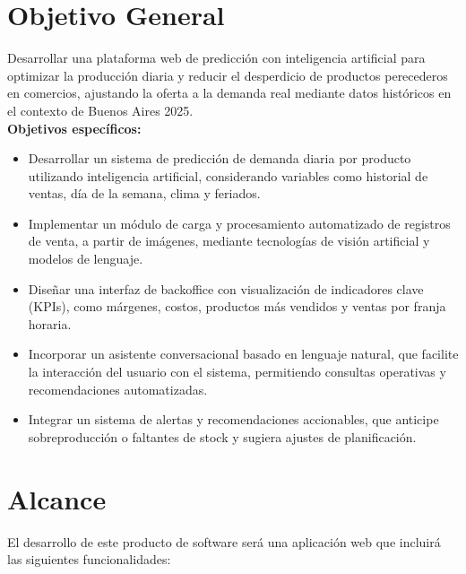 \section{Objetivo General}

Desarrollar una plataforma web de predicción con inteligencia artificial para optimizar la producción diaria y reducir el desperdicio de productos perecederos en comercios, ajustando la oferta a la demanda real mediante datos históricos en el contexto de Buenos Aires 2025.\\

\noindent\textbf{Objetivos específicos:}

\begin{itemize}
    \item Desarrollar un sistema de predicción de demanda diaria por producto utilizando inteligencia artificial, considerando variables como historial de ventas, día de la semana, clima y feriados.
    
    \item Implementar un módulo de carga y procesamiento automatizado de registros de venta, a partir de imágenes, mediante tecnologías de visión artificial y modelos de lenguaje.
    
    \item Diseñar una interfaz de backoffice con visualización de indicadores clave (KPIs), como márgenes, costos, productos más vendidos y ventas por franja horaria.
    
    \item Incorporar un asistente conversacional basado en lenguaje natural, que facilite la interacción del usuario con el sistema, permitiendo consultas operativas y recomendaciones automatizadas.
    
    \item Integrar un sistema de alertas y recomendaciones accionables, que anticipe sobreproducción o faltantes de stock y sugiera ajustes de planificación.
    
\end{itemize}

\section{Alcance}

El desarrollo de este producto de software será una aplicación web que incluirá las siguientes funcionalidades:

